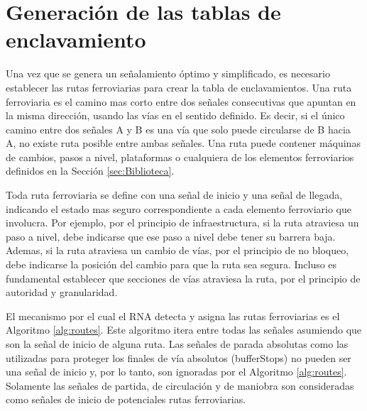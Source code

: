 \section{Generación de las tablas de enclavamiento}
	\label{sec:rutas}
	
	
	Una vez que se genera un señalamiento óptimo y simplificado, es necesario establecer las rutas ferroviarias para crear la tabla de enclavamientos. Una ruta ferroviaria es el camino mas corto entre dos señales consecutivas que apuntan en la misma dirección, usando las vías en el sentido definido. Es decir, si el único camino entre dos señales A y B es una vía que solo puede circularse de B hacia A, no existe ruta posible entre ambas señales. Una ruta puede contener máquinas de cambios, pasos a nivel, plataformas o cualquiera de los elementos ferroviarios definidos en la Sección \ref{sec:Biblioteca}.
	
	Toda ruta ferroviaria se define con una señal de inicio y una señal de llegada, indicando el estado mas seguro correspondiente a cada elemento ferroviario que involucra. Por ejemplo, por el principio de infraestructura, si la ruta atraviesa un paso a nivel, debe indicarse que ese paso a nivel debe tener su barrera baja. Ademas, si la ruta atraviesa un cambio de vías, por el principio de no bloqueo, debe indicarse la posición del cambio para que la ruta sea segura. Incluso es fundamental establecer que secciones de vías atraviesa la ruta, por el principio de autoridad y granularidad.
	
	El mecanismo por el cual el RNA detecta y asigna las rutas ferroviarias es el Algoritmo \ref{alg:routes}. Este algoritmo itera entre todas las señales asumiendo que son la señal de inicio de alguna ruta. Las señales de parada absolutas como las utilizadas para proteger los finales de vía absolutos (bufferStops) no pueden ser una señal de inicio y, por lo tanto, son ignoradas por el Algoritmo \ref{alg:routes}. Solamente las señales de partida, de circulación y de maniobra son consideradas como señales de inicio de potenciales rutas ferroviarias.
	
